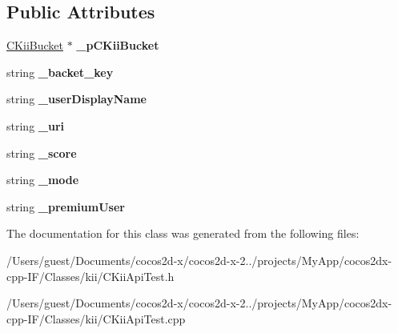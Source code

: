 \subsection*{Public Attributes}
\begin{DoxyCompactItemize}
\item 
\hypertarget{class_c_kii_api_test_a0efcca05f0b3d0f1528a4762257162a6}{\hyperlink{class_c_kii_bucket}{C\-Kii\-Bucket} $\ast$ {\bfseries \-\_\-p\-C\-Kii\-Bucket}}\label{class_c_kii_api_test_a0efcca05f0b3d0f1528a4762257162a6}

\item 
\hypertarget{class_c_kii_api_test_a89ebde6fedb62ffe5ed9f98e52cf6945}{string {\bfseries \-\_\-backet\-\_\-key}}\label{class_c_kii_api_test_a89ebde6fedb62ffe5ed9f98e52cf6945}

\item 
\hypertarget{class_c_kii_api_test_ad39e9b070aca7754a6c754ff5f769594}{string {\bfseries \-\_\-user\-Display\-Name}}\label{class_c_kii_api_test_ad39e9b070aca7754a6c754ff5f769594}

\item 
\hypertarget{class_c_kii_api_test_a2e9cdd55bde457920b81a0a0305e5da3}{string {\bfseries \-\_\-uri}}\label{class_c_kii_api_test_a2e9cdd55bde457920b81a0a0305e5da3}

\item 
\hypertarget{class_c_kii_api_test_a3d774834785707b2870f338cd5a1f60c}{string {\bfseries \-\_\-score}}\label{class_c_kii_api_test_a3d774834785707b2870f338cd5a1f60c}

\item 
\hypertarget{class_c_kii_api_test_aba900d1c916318386b8d6364ac9abf76}{string {\bfseries \-\_\-mode}}\label{class_c_kii_api_test_aba900d1c916318386b8d6364ac9abf76}

\item 
\hypertarget{class_c_kii_api_test_a819ad2cb6fa1387ce02f8c33aee4b8f6}{string {\bfseries \-\_\-premium\-User}}\label{class_c_kii_api_test_a819ad2cb6fa1387ce02f8c33aee4b8f6}

\end{DoxyCompactItemize}


The documentation for this class was generated from the following files\-:\begin{DoxyCompactItemize}
\item 
/\-Users/guest/\-Documents/cocos2d-\/x/cocos2d-\/x-\/2../projects/\-My\-App/cocos2dx-\/cpp-\/\-I\-F/\-Classes/kii/C\-Kii\-Api\-Test.\-h\item 
/\-Users/guest/\-Documents/cocos2d-\/x/cocos2d-\/x-\/2../projects/\-My\-App/cocos2dx-\/cpp-\/\-I\-F/\-Classes/kii/C\-Kii\-Api\-Test.\-cpp\end{DoxyCompactItemize}

